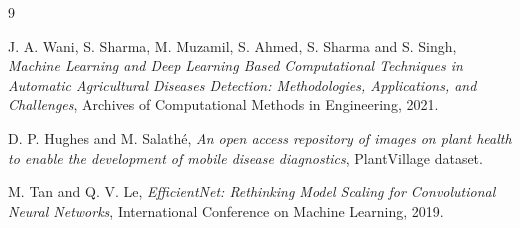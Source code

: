 \documentclass[12pt,a4paper]{report}
\begin{document}
\begin{thebibliography}{9}

J. A. Wani, S. Sharma, M. Muzamil, S. Ahmed, S. Sharma and S. Singh,
\textit{Machine Learning and Deep Learning Based Computational Techniques in Automatic Agricultural Diseases Detection: Methodologies, Applications, and Challenges},
Archives of Computational Methods in Engineering, 2021.

D. P. Hughes and M. Salathé,
\textit{An open access repository of images on plant health to enable the development of mobile disease diagnostics},
PlantVillage dataset.

M. Tan and Q. V. Le,
\textit{EfficientNet: Rethinking Model Scaling for Convolutional Neural Networks},
International Conference on Machine Learning, 2019.

\end{thebibliography}
\end{document}
